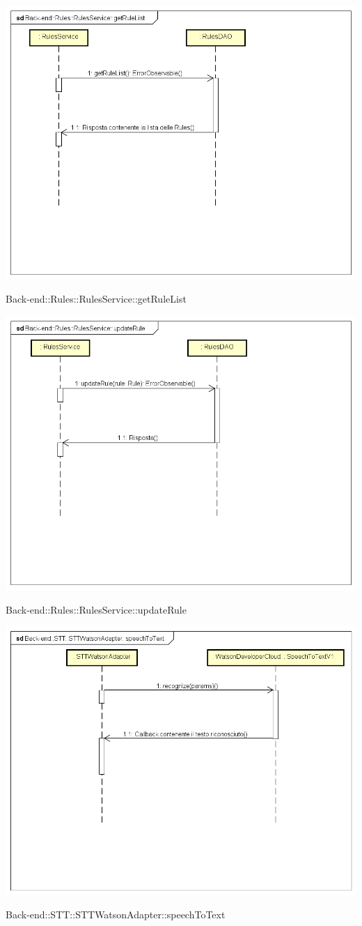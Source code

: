 \includegraphics[width=\textwidth,height=\textheight,keepaspectratio]{images/diagrams/back-end/Ufficial_Backend/Back-end__Rules__RulesService__getRuleList.png} 	\caption{Back-end::Rules::RulesService::getRuleList}
\includegraphics[width=\textwidth,height=\textheight,keepaspectratio]{images/diagrams/back-end/Ufficial_Backend/Back-end__Rules__RulesService__updateRule.png} 	\caption{Back-end::Rules::RulesService::updateRule}
\includegraphics[width=\textwidth,height=\textheight,keepaspectratio]{images/diagrams/back-end/Ufficial_Backend/Back-end__STT__STTWatsonAdapter__speechToText.png} 	\caption{Back-end::STT::STTWatsonAdapter::speechToText}